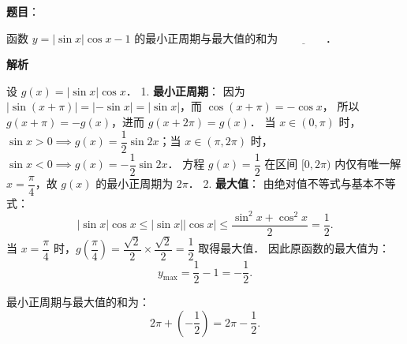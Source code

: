 \begin{answer}

\textbf{题目}：

函数 $y = |\sin x|\cos x - 1$ 的最小正周期与最大值的和为 $\underline{\qquad\qquad}$．

\textbf{解析}

设 $g(x) = |\sin x|\cos x$．
1. \textbf{最小正周期}：
   因为 $|\sin(x + \pi)| = |-\sin x| = |\sin x|$，而 $\cos(x + \pi) = -\cos x$，
   所以 $g(x + \pi) = -g(x)$，进而 $g(x + 2\pi) = g(x)$．
   当 $x \in (0, \pi)$ 时，$\sin x > 0 \implies g(x) = \dfrac{1}{2}\sin 2x$；当 $x \in (\pi, 2\pi)$ 时，$\sin x < 0 \implies g(x) = -\dfrac{1}{2}\sin 2x$．
   方程 $g(x) = \dfrac{1}{2}$ 在区间 $[0, 2\pi)$ 内仅有唯一解 $x = \dfrac{\pi}{4}$，故 $g(x)$ 的最小正周期为 $2\pi$．
2. \textbf{最大值}：
   由绝对值不等式与基本不等式：
\nopagebreak[4]
\[
|\sin x|\cos x \leqslant |\sin x| |\cos x| \leqslant \frac{\sin^2 x + \cos^2 x}{2} = \frac{1}{2}.
\]
   当 $x = \dfrac{\pi}{4}$ 时，$g\left(\dfrac{\pi}{4}\right) = \dfrac{\sqrt{2}}{2} \times \dfrac{\sqrt{2}}{2} = \dfrac{1}{2}$ 取得最大值．
   因此原函数的最大值为：
\nopagebreak[4]
\[
y_{\max} = \frac{1}{2} - 1 = -\frac{1}{2}.
\]

最小正周期与最大值的和为：
\nopagebreak[4]
\[
2\pi + \left(-\frac{1}{2}\right) = 2\pi - \frac{1}{2}.
\]


\end{answer}
